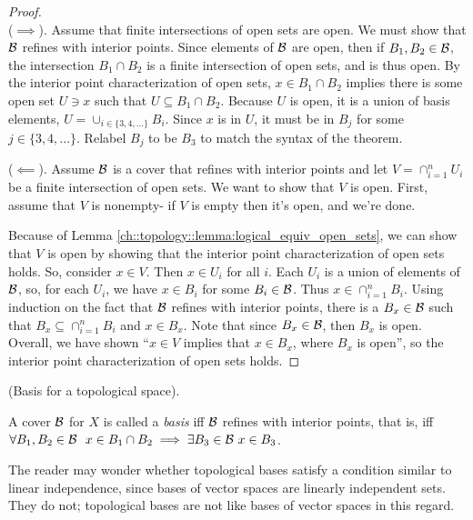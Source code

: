 \begin{proof}
    \mbox{} \\ \indent
    ($\implies$). Assume that finite intersections of open sets are open. We must show that $\mathcal{B}$ refines with interior points. Since elements of $\mathcal{B}$ are open, then if $B_1, B_2 \in \mathcal{B}$, the intersection $B_1 \cap B_2$ is a finite intersection of open sets, and is thus open. By the interior point characterization of open sets, $x \in B_1 \cap B_2$ implies there is some open set $U \ni x$ such that $U \subseteq B_1 \cap B_2$. Because $U$ is open, it is a union of basis elements, $U = \cup_{i \in \{3, 4, ... \}} B_i$. Since $x$ is in $U$, it must be in $B_j$ for some $j \in \{3, 4, ... \}$. Relabel $B_j$ to be $B_3$ to match the syntax of the theorem.

    ($\impliedby$). Assume $\mathcal{B}$ is a cover that refines with interior points and let $V = \cap_{i = 1}^n U_i$ be a finite intersection of open sets. We want to show that $V$ is open. First, assume that $V$ is nonempty- if $V$ is empty then it's open, and we're done.

    Because of Lemma \ref{ch::topology::lemma:logical_equiv_open_sets}, we can show that $V$ is open by showing that the interior point characterization of open sets holds. So, consider $x \in V$. Then $x \in U_i$ for all $i$. Each $U_i$ is a union of elements of $\mathcal{B}$, so, for each $U_i$, we have $x \in B_i$ for some $B_i \in \mathcal{B}$. Thus $x \in \cap_{i = 1}^n B_i$. Using induction on the fact that $\mathcal{B}$ refines with interior points, there is a $B_x \in \mathcal{B}$ such that $B_x \subseteq \cap_{i = 1}^n B_i$ and $x \in B_x$. Note that since $B_x \in \mathcal{B}$, then $B_x$ is open. Overall, we have shown ``$x \in V$ implies that $x \in B_x$, where $B_x$ is open'', so the interior point characterization of open sets holds.
\end{proof}

\begin{defn}
    (Basis for a topological space).
    
    A cover $\mathcal{B}$ for $X$ is called a \textit{basis} iff $\mathcal{B}$ refines with interior points, that is, iff \\ ${\forall B_1, B_2 \in \mathcal{B} \text{ } \text{ } x \in B_1 \cap B_2 \implies \exists B_3 \in \mathcal{B} \text{ } x \in B_3}$.
    
    The reader may wonder whether topological bases satisfy a condition similar to linear independence, since bases of vector spaces are linearly independent sets. They do not; topological bases are not like bases of vector spaces in this regard.
\end{defn}

